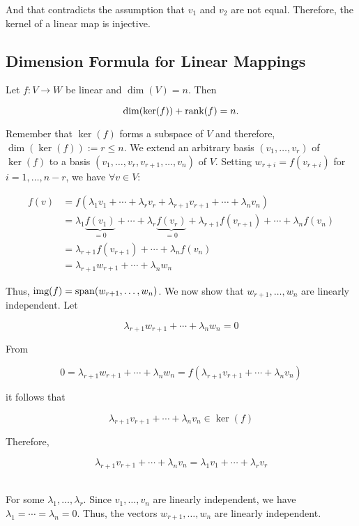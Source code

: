 And that contradicts the assumption that \(v_1\) and \(v_2\) are not equal. Therefore, the 
kernel of a linear map is injective.

\subsection{Dimension Formula for Linear Mappings}

Let \(f: V \to W\) be linear and \(\dim(V) = n\). Then
    
\[
    \dim(\ker(f)) + \text{rank}(f) = n.
\]
    
Remember that \(\ker(f)\) forms a subspace of \(V\) and therefore, \(\dim(\ker(f)) := r \leq n\). We extend an arbitrary basis \((v_1, \ldots, v_r)\) of \(\ker(f)\) to a basis \((v_1, \ldots, v_r, v_{r+1}, \ldots, v_n)\) of \(V\). Setting \(w_{r+i} = f(v_{r+i})\) for \(i = 1, \ldots, n - r\), we have \(\forall v \in V\):

\begin{align*}
    f(v) &= f(\lambda_1v_1 + \cdots + \lambda_r v_r + \lambda_{r+1}v_{r+1} + \cdots + \lambda_n v_n) \\
    &= \lambda_1 \underbrace{f(v_1)}_{=0} + \cdots + \lambda_r \underbrace{f(v_r)}_{=0} + \lambda_{r+1} f(v_{r+1}) + \cdots + \lambda_n f(v_n) \\
    &= \lambda_{r+1} f(v_{r+1}) + \cdots + \lambda_n f(v_n) \\
    &= \lambda_{r+1}w_{r+1} + \cdots + \lambda_n w_n
\end{align*}
    
Thus, \(\text{img}(f) = \operatorname{span}(w_{r+1}, \ldots, w_n)\). We now show that \(w_{r+1}, \ldots, w_n\) are linearly independent. Let 
    
\[
    \lambda_{r+1}w_{r+1} + \cdots + \lambda_n w_n = 0
\]
    
From

\[
    0 = \lambda_{r+1}w_{r+1} + \cdots + \lambda_n w_n = f(\lambda_{r+1}v_{r+1} + \cdots + \lambda_n v_n)
\]
    
it follows that

\[
    \lambda_{r+1}v_{r+1} + \cdots + \lambda_n v_n \in \ker(f)
\]
    
Therefore,
    
\[
    \lambda_{r+1}v_{r+1} + \cdots + \lambda_n v_n = \lambda_1v_1 + \cdots + \lambda_r v_r
\]\

For some \(\lambda_1, \ldots, \lambda_r\). Since \(v_1, \ldots, v_n\) are linearly independent, 
we have \(\lambda_1 = \cdots = \lambda_n = 0\). Thus, the vectors \(w_{r+1}, \ldots, w_n\) are linearly 
independent.
    
